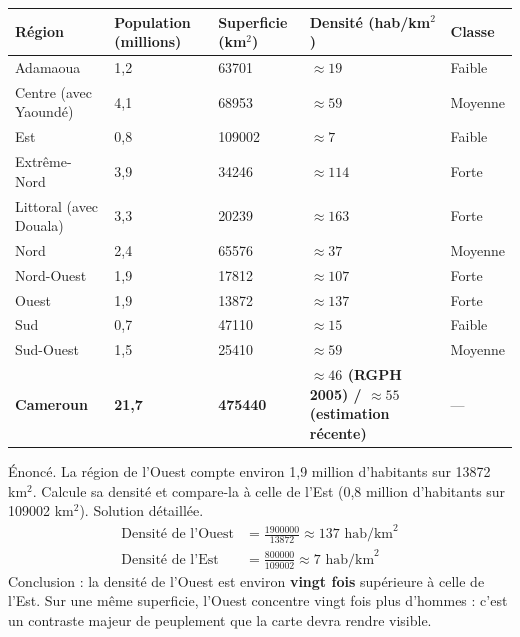 \documentclass[11pt]{article}
\begin{document}
\begin{center}
\begin{tabularx}{\linewidth}{|l|X|X|X|X|}
\hline
\rowcolor{popblueL} \textbf{Région} & \textbf{Population (millions)} & \textbf{Superficie (km$^2$)} & \textbf{Densité (hab/km$^2$)} & \textbf{Classe} \\
\hline
Adamaoua & 1,2 & \num{63701} & $\approx 19$ & Faible \\
\hline
Centre (avec Yaoundé) & 4,1 & \num{68953} & $\approx 59$ & Moyenne \\
\hline
Est & 0,8 & \num{109002} & $\approx 7$ & Faible \\
\hline
Extrême-Nord & 3,9 & \num{34246} & $\approx 114$ & Forte \\
\hline
Littoral (avec Douala) & 3,3 & \num{20239} & $\approx 163$ & Forte \\
\hline
Nord & 2,4 & \num{65576} & $\approx 37$ & Moyenne \\
\hline
Nord-Ouest & 1,9 & \num{17812} & $\approx 107$ & Forte \\
\hline
Ouest & 1,9 & \num{13872} & $\approx 137$ & Forte \\
\hline
Sud & 0,7 & \num{47110} & $\approx 15$ & Faible \\
\hline
Sud-Ouest & 1,5 & \num{25410} & $\approx 59$ & Moyenne \\
\hline
\textbf{Cameroun} & \textbf{21,7} & \textbf{\num{475440}} & \textbf{$\approx 46$ (RGPH 2005) / $\approx 55$ (estimation récente)} & --- \\
\hline
\end{tabularx}
\end{center}

\begin{exoresolu}
Énoncé. La région de l'Ouest compte environ 1,9 million d'habitants sur \num{13872} km$^2$. Calcule sa densité et compare-la à celle de l'Est (0,8 million d'habitants sur \num{109002} km$^2$).
\tcblower
Solution détaillée.
\begin{align*}
\text{Densité de l'Ouest} &= \frac{\num{1900000}}{\num{13872}} \approx 137 \text{ hab/km}^2 \\
\text{Densité de l'Est} &= \frac{\num{800000}}{\num{109002}} \approx 7 \text{ hab/km}^2
\end{align*}
Conclusion : la densité de l'Ouest est environ \textbf{vingt fois} supérieure à celle de l'Est. Sur une même superficie, l'Ouest concentre vingt fois plus d'hommes : c'est un contraste majeur de peuplement que la carte devra rendre visible.
\end{exoresolu}
\end{document}

